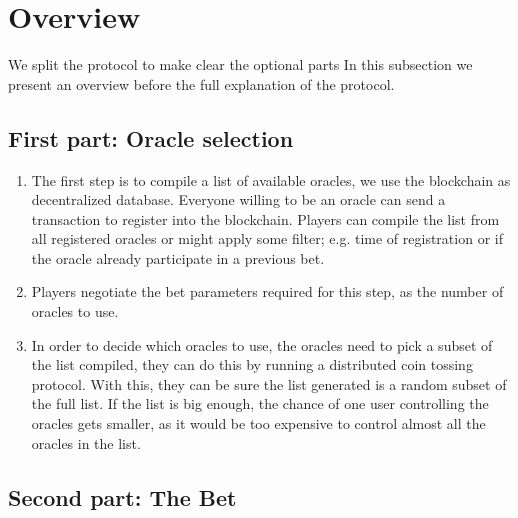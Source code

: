 \section{Overview}

We split the protocol to make clear the optional parts
In this subsection we present an overview before the full explanation of the
  protocol.

\subsection{First part: Oracle selection}

\begin{enumerate}
  \item The first step is to compile a list of available oracles, we use the
      blockchain as decentralized database.
      Everyone willing to be an oracle can send a transaction to register into
      the blockchain.
      Players can compile the list from all registered oracles or might apply
      some filter; e.g. time of registration or if the oracle already participate
      in a previous bet.
  \item Players negotiate the bet parameters required for this step, as the
      number of oracles to use.
  \item In order to decide which oracles to use, the oracles need to pick a
      subset of the list compiled, they can do this by running a distributed
      coin tossing protocol.
    With this, they can be sure the list generated is a random subset of the
      full list. If the list is big enough, the chance of one user controlling
      the oracles gets smaller, as it would be too expensive to control almost
      all the oracles in the list.
\end{enumerate}

\subsection{Second part: The Bet}

